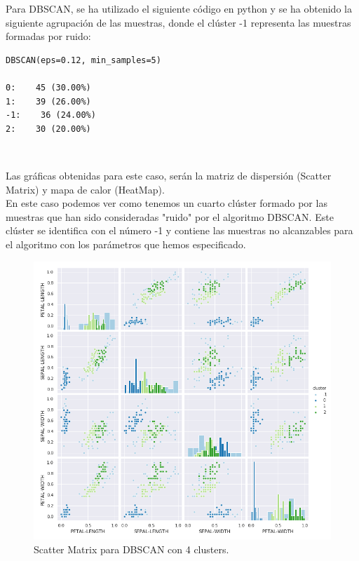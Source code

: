 \documentclass[a4paper, 20pt]{article}
\begin{document}
Para DBSCAN, se ha utilizado el siguiente código en python y se ha obtenido la siguiente agrupación de las muestras, donde el clúster -1 representa las muestras formadas por ruido:\\

\begin{lstlisting}
DBSCAN(eps=0.12, min_samples=5)

0:    45 (30.00%)
1:    39 (26.00%)
-1:    36 (24.00%)
2:    30 (20.00%)
\end{lstlisting}\

Las gráficas obtenidas para este caso, serán la matriz de dispersión (Scatter Matrix) y mapa de calor (HeatMap).\\

En este caso podemos ver como tenemos un cuarto clúster formado por las muestras que han sido consideradas "ruido" por el algoritmo DBSCAN. Este clúster se identifica con el número -1 y contiene las muestras no alcanzables para el algoritmo con los parámetros que hemos especificado.

\begin{figure}[h]
\centering
\includegraphics[scale=0.64]{dani/scatmatrixDBSCANIRIS.png}
\caption{Scatter Matrix para DBSCAN con 4 clusters.}
\label{smdb}
\end{figure}

\clearpage
\end{document}
